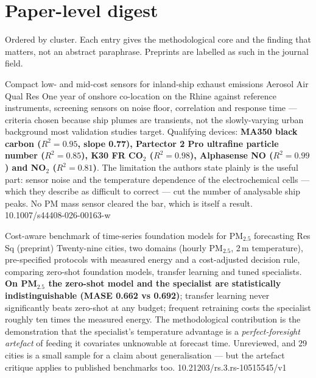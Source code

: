 \documentclass[10pt]{article}
\begin{document}
\clearpage

\section*{\sffamily\bfseries\color{Deep}Paper-level digest}
\vspace{-1.5mm}{\color{Amber}\rule{\linewidth}{1.1pt}}\vspace{1mm}

{\fontsize{7.4}{9}\selectfont\color{Slate}Ordered by cluster. Each entry gives the
methodological core and the finding that matters, not an abstract paraphrase.
Preprints are labelled as such in the journal field.\par}


{Compact low- and mid-cost sensors for inland-ship exhaust emissions}
{Aerosol Air Qual Res}
{One year of onshore co-location on the Rhine against reference instruments, screening
sensors on noise floor, correlation and response time --- criteria chosen because ship
plumes are transients, not the slowly-varying urban background most validation studies
target. Qualifying devices: \textbf{MA350 black carbon ($R^2=0.95$, slope 0.77),
Partector 2 Pro ultrafine particle number ($R^2=0.85$), K30 FR CO$_2$ ($R^2=0.98$),
Alphasense NO ($R^2=0.99$) and NO$_2$ ($R^2=0.81$)}. The limitation the authors state
plainly is the useful part: sensor noise and the temperature dependence of the
electrochemical cells --- which they describe as difficult to correct --- cut the number
of analysable ship peaks. No PM mass sensor cleared the bar, which is itself a result.}
{10.1007/s44408-026-00163-w}

{Cost-aware benchmark of time-series foundation models for PM$_{2.5}$ forecasting}
{Res Sq (preprint)}
{Twenty-nine cities, two domains (hourly PM$_{2.5}$, 2\,m temperature), pre-specified
protocols with measured energy and a cost-adjusted decision rule, comparing zero-shot
foundation models, transfer learning and tuned specialists. \textbf{On PM$_{2.5}$ the
zero-shot model and the specialist are statistically indistinguishable (MASE 0.662 vs
0.692)}; transfer learning never significantly beats zero-shot at any budget; frequent
retraining costs the specialist roughly ten times the measured energy. The
methodological contribution is the demonstration that the specialist's temperature
advantage is a \emph{perfect-foresight artefact} of feeding it covariates unknowable at
forecast time. Unreviewed, and 29 cities is a small sample for a claim about
generalisation --- but the artefact critique applies to published benchmarks too.}
{10.21203/rs.3.rs-10515545/v1}
\end{document}
